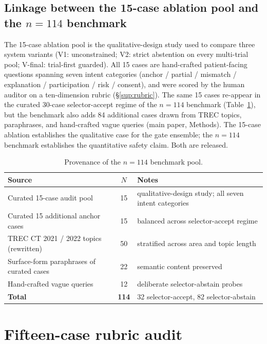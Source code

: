 \documentclass[11pt]{article}
\begin{document}
\subsection{Linkage between the 15-case ablation pool and the $n=114$ benchmark}
\label{sup:linkage}
The 15-case ablation pool is the qualitative-design study used to compare three system variants (V1: unconstrained; V2: strict abstention on every multi-trial pool; V-final: trial-first guarded). All 15 cases are hand-crafted patient-facing questions spanning seven intent categories (anchor / partial / mismatch / explanation / participation / risk / consent), and were scored by the human auditor on a ten-dimension rubric (\S\ref{sup:rubric}). The same 15 cases re-appear in the curated 30-case selector-accept regime of the $n=114$ benchmark (Table~\ref{tab:case_provenance}), but the benchmark also adds 84 additional cases drawn from TREC topics, paraphrases, and hand-crafted vague queries (main paper, Methods). The 15-case ablation establishes the qualitative case for the gate ensemble; the $n=114$ benchmark establishes the quantitative safety claim. Both are released.

\begin{table}[!htbp]
\centering
\caption{Provenance of the $n=114$ benchmark pool.}
\label{tab:case_provenance}
\small
\begin{tabular}{l c l}
\toprule
Source & $N$ & Notes \\
\midrule
Curated 15-case audit pool                   & 15  & qualitative-design study; all seven intent categories \\
Curated 15 additional anchor cases           & 15  & balanced across selector-accept regime \\
TREC CT 2021 / 2022 topics (rewritten)       & 50  & stratified across area and topic length \\
Surface-form paraphrases of curated cases    & 22  & semantic content preserved \\
Hand-crafted vague queries                   & 12  & deliberate selector-abstain probes \\
\midrule
\textbf{Total}                               & \textbf{114} & 32 selector-accept, 82 selector-abstain \\
\bottomrule
\end{tabular}
\end{table}

\section{Fifteen-case rubric audit}
\label{sup:audit}
\end{document}
